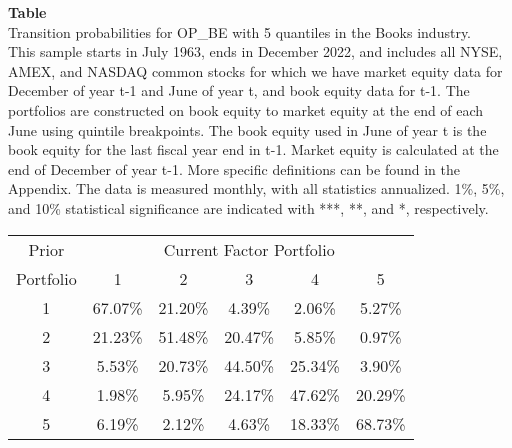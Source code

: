 \begin{table*}[ht!]
\raggedright
{}
\label{tab: transition_probs_OP_BE_Books_with_5_quantiles}
\textbf{Table \thetable} \\
Transition probabilities for OP_BE with 5 quantiles in the Books industry. \\
\hspace*{1em}This sample starts in July 1963, ends in December 2022, and includes all NYSE, AMEX, and NASDAQ common stocks for which we have market equity data for December of year t-1 and June of year t, and book equity data for t-1. The portfolios are constructed on book equity to market equity at the end of each June using quintile breakpoints.  The book equity used in June of year t is the book equity for the last fiscal year end in t-1.  Market equity is calculated at the end of December of year t-1.  More specific definitions can be found in the Appendix.  The data is measured monthly, with all statistics annualized.  1\%, 5\%, and 10\% statistical significance are indicated with ***, **, and *, respectively. \\
\vspace{0.5em}
\centering
\begin{adjustbox}{max width=\textwidth}
\begin{tabular}{@{}cccccc@{}}
\toprule
Prior & \multicolumn{5}{c}{Current Factor Portfolio} \\
Portfolio & 1 & 2 & 3 & 4 & 5 \\
\midrule
1 & 67.07\% & 21.20\% & 4.39\% & 2.06\% & 5.27\% \\
2 & 21.23\% & 51.48\% & 20.47\% & 5.85\% & 0.97\% \\
3 & 5.53\% & 20.73\% & 44.50\% & 25.34\% & 3.90\% \\
4 & 1.98\% & 5.95\% & 24.17\% & 47.62\% & 20.29\% \\
5 & 6.19\% & 2.12\% & 4.63\% & 18.33\% & 68.73\% \\
\bottomrule
\end{tabular}
\end{adjustbox}
\end{table*}